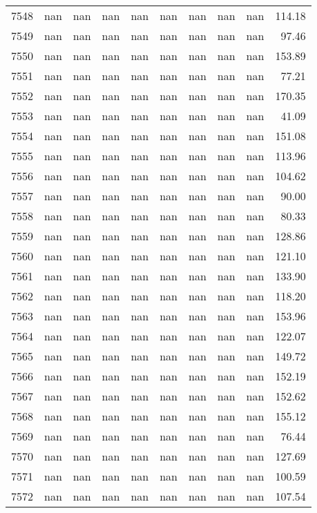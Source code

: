 \begin{tabular}{lrrrrrrrrr}
7548 & nan & nan & nan & nan & nan & nan & nan & nan & 114.18 \\
7549 & nan & nan & nan & nan & nan & nan & nan & nan & 97.46 \\
7550 & nan & nan & nan & nan & nan & nan & nan & nan & 153.89 \\
7551 & nan & nan & nan & nan & nan & nan & nan & nan & 77.21 \\
7552 & nan & nan & nan & nan & nan & nan & nan & nan & 170.35 \\
7553 & nan & nan & nan & nan & nan & nan & nan & nan & 41.09 \\
7554 & nan & nan & nan & nan & nan & nan & nan & nan & 151.08 \\
7555 & nan & nan & nan & nan & nan & nan & nan & nan & 113.96 \\
7556 & nan & nan & nan & nan & nan & nan & nan & nan & 104.62 \\
7557 & nan & nan & nan & nan & nan & nan & nan & nan & 90.00 \\
7558 & nan & nan & nan & nan & nan & nan & nan & nan & 80.33 \\
7559 & nan & nan & nan & nan & nan & nan & nan & nan & 128.86 \\
7560 & nan & nan & nan & nan & nan & nan & nan & nan & 121.10 \\
7561 & nan & nan & nan & nan & nan & nan & nan & nan & 133.90 \\
7562 & nan & nan & nan & nan & nan & nan & nan & nan & 118.20 \\
7563 & nan & nan & nan & nan & nan & nan & nan & nan & 153.96 \\
7564 & nan & nan & nan & nan & nan & nan & nan & nan & 122.07 \\
7565 & nan & nan & nan & nan & nan & nan & nan & nan & 149.72 \\
7566 & nan & nan & nan & nan & nan & nan & nan & nan & 152.19 \\
7567 & nan & nan & nan & nan & nan & nan & nan & nan & 152.62 \\
7568 & nan & nan & nan & nan & nan & nan & nan & nan & 155.12 \\
7569 & nan & nan & nan & nan & nan & nan & nan & nan & 76.44 \\
7570 & nan & nan & nan & nan & nan & nan & nan & nan & 127.69 \\
7571 & nan & nan & nan & nan & nan & nan & nan & nan & 100.59 \\
7572 & nan & nan & nan & nan & nan & nan & nan & nan & 107.54 \\

\end{tabular}
